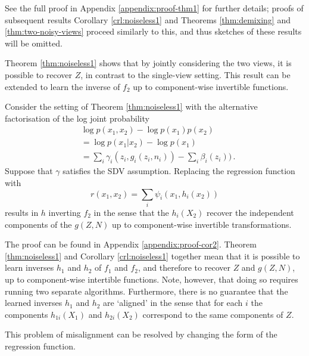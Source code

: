 See the full proof in Appendix \ref{appendix:proof-thm1} for further details; proofs of subsequent results Corollary \ref{crl:noiseless1} and Theorems \ref{thm:demixing} and \ref{thm:two-noisy-views} proceed similarly to this, and thus sketches of these results will be omitted.

Theorem \ref{thm:noiseless1} shows that by jointly considering the two views, it is possible to recover $Z$, in contrast to the single-view setting.
This result can be extended to learn the inverse of ${f}_2$ up to component-wise invertible functions.

\medskip

\begin{corollary}
	\label{crl:noiseless1}
	Consider the setting of Theorem \ref{thm:noiseless1} with the alternative factorisation of the log joint probability
	\begin{align}
	&\log p({x}_1, {x}_2) - \log p({x}_1) p({x}_2) \nonumber \\
	&= \log p({x}_1 | {x}_2) - \log p({x}_1)\nonumber \\
	&= \sum_i \gamma_i(z_i, g_i(z_i, n_i)) - \sum_i \beta_i(z_i)) \label{eq:logdens_noiesless_2}\,.
	\end{align}
	Suppose that ${\gamma}$ satisfies the SDV assumption.
	Replacing the regression function with
	\begin{equation*}
	r({x}_{1},{x}_{2})=\sum_{i}\psi_{i}({x}_{1}, h_{i}({x}_{2}))
	\end{equation*}
	results in ${h}$ inverting ${f}_2$ in the sense that the $h_{i}({X}_2)$ recover the independent components of the ${g}({Z}, {N})$ up  to component-wise invertible transformations.
\end{corollary}
The proof can be found in Appendix \ref{appendix:proof-cor2}.
Theorem \ref{thm:noiseless1} and Corollary \ref{crl:noiseless1} together mean that it is possible to learn inverses ${h}_1$ and ${h}_2$ of ${f}_1$ and ${f}_2$, and therefore to recover ${Z}$ and ${g}({Z}, {N})$, up to component-wise intertible functions.
Note, however, that doing so requires running two separate algorithms.
Furthermore, there is no guarantee that the learned inverses ${h}_1$ and ${h}_2$ are `aligned' in the sense that for each $i$ the components ${h}_{1i}({X}_1)$ and ${h}_{2i}({X}_2)$ correspond to the same components of ${Z}$.

This problem of misalignment can be resolved by changing the form of the regression function.

\medskip

